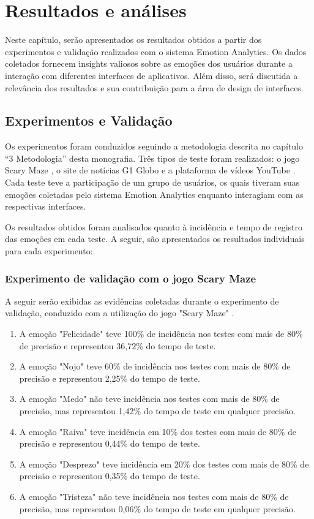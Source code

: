 \chapter{Resultados e análises}

Neste capítulo, serão apresentados os resultados obtidos a partir dos experimentos e validação realizados com o sistema Emotion Analytics. Os dados coletados fornecem insights valiosos sobre as emoções dos usuários durante a interação com diferentes interfaces de aplicativos. Além disso, será discutida a relevância dos resultados e sua contribuição para a área de design de interfaces.

\section{Experimentos e Validação}

Os experimentos foram conduzidos seguindo a metodologia descrita no capítulo “3 Metodologia” desta monografia. Três tipos de teste foram realizados: o jogo Scary Maze \cite{18}, o site de notícias G1 Globo \cite{19} e a plataforma de vídeos YouTube \cite{20}. Cada teste teve a participação de um grupo de usuários, os quais tiveram suas emoções coletadas pelo sistema Emotion Analytics enquanto interagiam com as respectivas interfaces.

Os resultados obtidos foram analisados quanto à incidência e tempo de registro das emoções em cada teste. A seguir, são apresentados os resultados individuais para cada experimento:

\subsection{Experimento de validação com o jogo Scary Maze}

A seguir serão exibidas as evidências coletadas durante o experimento de validação, conduzido com a utilização do jogo "Scary Maze" \cite{18}.

\begin{enumerate}
  \item A emoção "Felicidade" teve 100\% de incidência nos testes com mais de 80\% de precisão e representou 36,72\% do tempo de teste.
  \item A emoção "Nojo" teve 60\% de incidência nos testes com mais de 80\% de precisão e representou 2,25\% do tempo de teste.
  \item A emoção "Medo" não teve incidência nos testes com mais de 80\% de precisão, mas representou 1,42\% do tempo de teste em qualquer precisão.
  \item A emoção "Raiva" teve incidência em 10\% dos testes com mais de 80\% de precisão e representou 0,44\% do tempo de teste.
  \item A emoção "Desprezo" teve incidência em 20\% dos testes com mais de 80\% de precisão e representou 0,35\% do tempo de teste.
  \item A emoção "Tristeza" não teve incidência nos testes com mais de 80\% de precisão, mas representou 0,06\% do tempo de teste em qualquer precisão.
\end{enumerate}

